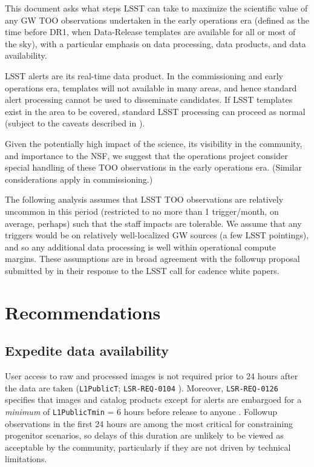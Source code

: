 \documentclass[DM,authoryear,toc]{lsstdoc}
\begin{document}
This document asks what steps LSST can take to maximize the scientific value of any GW TOO observations undertaken in the early operations era (defined as the time before DR1, when Data-Release templates are available for all or most of the sky), with a particular emphasis on data processing, data products, and data availability.

LSST alerts are its real-time data product.  
In the commissioning and early operations era, 
templates will not available in many areas, and hence standard alert processing cannot be used to disseminate candidates.
If LSST templates exist in the area to be covered, standard LSST processing can proceed as normal (subject to the caveats described in ).

Given the potentially high impact of the science, its visibility in the community, and importance to the NSF, we suggest that the operations project consider special handling of these TOO observations in the early operations era.  
(Similar considerations apply in commissioning.) 

The following analysis assumes that LSST TOO observations are relatively uncommon in this period (restricted to no more than 1 trigger/month, on average, perhaps) such that the staff impacts are tolerable.  
We assume that any triggers would be on relatively well-localized GW sources (a few LSST pointings), and so any additional data processing is well within operational compute margins.
These assumptions are in broad agreement with the followup proposal submitted by \citet{2018arXiv181204051M} in their response to the LSST call for cadence  white papers.

\section{Recommendations}

\subsection{Expedite data availability} \label{sec:data}

User access to raw and processed images is not required prior to 24 hours after the data are taken (\texttt{L1PublicT}; \texttt{LSR-REQ-0104} ).  
Moreover, \texttt{LSR-REQ-0126} specifies that images and catalog products except for alerts are embargoed for a \textit{minimum} of \texttt{L1PublicTmin} = 6 hours before release to anyone .
Followup observations in the first 24 hours are among the most critical for constraining progenitor scenarios, so delays of this duration are unlikely to be viewed as acceptable by the community, particularly if they are not driven by technical limitations.
\end{document}
